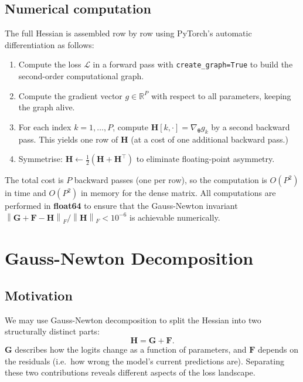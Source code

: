 \documentclass[12pt,a4paper]{article}
\newcommand{\R}{\mathbb{R}}
\newcommand{\norm}[1]{\left\lVert #1 \right\rVert}
\newcommand{\btheta}{\boldsymbol{\theta}}
\newcommand{\bH}{\mathbf{H}}
\newcommand{\bG}{\mathbf{G}}
\newcommand{\bF}{\mathbf{F}}
\begin{document}
\subsection{Numerical computation}
\label{ssec:hessian_comp}

The full Hessian is assembled row by row using PyTorch's automatic
differentiation as follows:
\begin{enumerate}
  \item Compute the loss $\mathcal{L}$ in a forward pass with
        \texttt{create\_graph=True} to build the second-order computational
        graph.
  \item Compute the gradient vector
        $g \in \R^P$ with respect to all parameters, keeping the
        graph alive.
  \item For each index $k = 1, \ldots, P$, compute
        $\mathbf{H}[k, \cdot] = \nabla_{\btheta} g_k$ by a second backward
        pass.  This yields one row of $\bH$ (at a cost of one additional
        backward pass.)
  \item Symmetrise: $\bH \leftarrow \tfrac{1}{2}(\bH + \bH^\top)$ to
        eliminate floating-point asymmetry.
\end{enumerate}
The total cost is $P$ backward passes (one per row), so the computation is
$O(P^2)$ in time and $O(P^2)$ in memory for the dense matrix.
All computations are performed in \textbf{float64} to
ensure that the Gauss-Newton invariant $\norm{\bG + \bF - \bH}_F /
\norm{\bH}_F < 10^{-6}$ is achievable numerically.


\section{Gauss-Newton Decomposition}
\label{sec:gn}

\subsection{Motivation}
\label{ssec:gn_motivation}

We may use Gauss-Newton decomposition to split the Hessian into
two structurally distinct parts:
\begin{equation}
  \bH = \bG + \bF.
  \label{eq:decomp}
\end{equation}
$\bG$ describes how the logits change as a function of parameters, and $\bF$ depends on the residuals (i.e.\ how wrong the model's current predictions are). Separating these two contributions reveals different aspects of the loss landscape.
\end{document}
